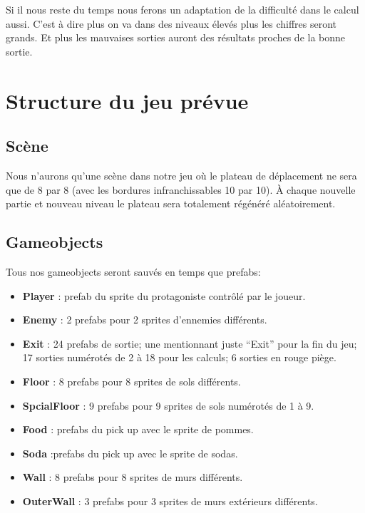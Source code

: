 \documentclass[onecolumn, 12pt]{article}
\begin{document}
Si il nous reste du temps nous ferons un adaptation de la difficulté
dans le calcul aussi. C'est à dire plus on va dans des niveaux élevés
plus les chiffres seront grands. Et plus les mauvaises sorties auront des
résultats proches de la bonne sortie.

\section{Structure du jeu
prévue}\label{structure-du-jeu-pruxe9vue}

\subsection{Scène}\label{scuxe8ne}

Nous n'aurons qu'une scène dans notre jeu où le plateau de déplacement
ne sera que de 8 par 8 (avec les bordures infranchissables 10 par 10). À
chaque nouvelle partie et nouveau niveau le plateau sera totalement
régénéré aléatoirement.

\subsection{Gameobjects}\label{gameobjects}

Tous nos gameobjects seront sauvés en temps que prefabs:

\begin{itemize}

\item
  \textbf{Player} : prefab du sprite du protagoniste contrôlé par le
  joueur.
\item
  \textbf{Enemy} : 2 prefabs pour 2 sprites d'ennemies différents.
\item
  \textbf{Exit} : 24 prefabs de sortie; une mentionnant juste ``Exit''
  pour la fin du jeu; 17 sorties numérotés de 2 à 18 pour les calculs; 6
  sorties en rouge piège.
\item
  \textbf{Floor} : 8 prefabs pour 8 sprites de sols différents.
\item
  \textbf{SpcialFloor} : 9 prefabs pour 9 sprites de sols numérotés de 1
  à 9.
\item
  \textbf{Food} : prefabs du pick up avec le sprite de pommes.
\item
  \textbf{Soda} :prefabs du pick up avec le sprite de sodas.
\item
  \textbf{Wall} : 8 prefabs pour 8 sprites de murs différents.
\item
  \textbf{OuterWall} : 3 prefabs pour 3 sprites de murs extérieurs
  différents.
\end{itemize}
\end{document}
